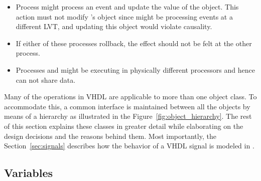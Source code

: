 \documentclass[11pt]{article}
\begin{document}

\begin{itemize}
\item Process \A\/ might process an event and update the value of the
  object.  This action must not modify \B's object since \B\/ might be
  processing events at a different LVT, and updating this object would
  violate causality.
\item If either of these processes rollback, the effect should not be felt
  at the other process.  
\item Processes \A\/ and \B\/ might be executing in physically different
  processors and hence can not share data.
\end{itemize}

Many of the operations in VHDL are applicable to more than one object
class.  To accommodate this, a common interface is maintained between
all the objects by means of a hierarchy as illustrated in the
Figure~\ref{fig:object_hierarchy}.  The rest of this section explains
these classes in greater detail while elaborating on the design
decisions and the reasons behind them.  Most importantly, the
Section~\ref{sec:signals} describes how the behavior of a VHDL signal
is modeled in \tyvis.

\subsection{Variables}
\end{document}
